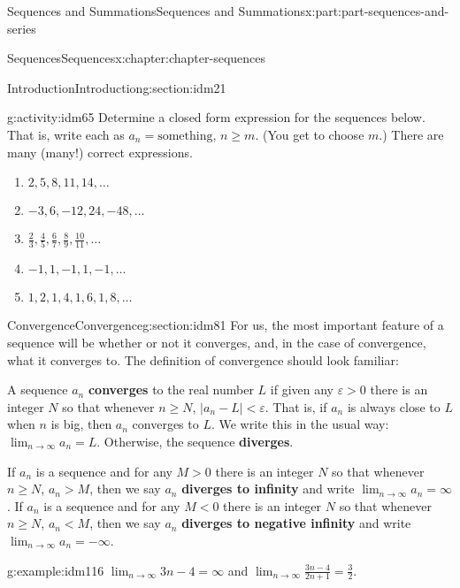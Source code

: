 \documentclass[oneside,10pt,]{book}
\newcommand{\terminology}[1]{\textbf{#1}}
\begin{document}
\begin{partptx}{Sequences and Summations}{}{Sequences and Summations}{}{}{x:part:part-sequences-and-series}
\begin{chapterptx}{Sequences}{}{Sequences}{}{}{x:chapter:chapter-sequences}
\begin{sectionptx}{Introduction}{}{Introduction}{}{}{g:section:idm21}
\begin{activity}{}{g:activity:idm65}%
Determine a closed form expression for the sequences below. That is, write each as \(a_n = \textrm{something}\), \(n \geq m\). (You get to choose \(m\).) There are many (many!) correct expressions.%
\begin{enumerate}[font=\bfseries,label=(\alph*),ref=\alph*]
\item{}\(2, 5, 8, 11, 14, \dots\)\item{}\(-3, 6, -12, 24, -48, \dots\)\item{}\(\frac{2}{3}, \frac{4}{5}, \frac{6}{7}, \frac{8}{9}, \frac{10}{11}, \dots\)\item{}\(-1, 1, -1, 1, -1, \dots\)\item{}\(1, 2, 1, 4, 1, 6, 1, 8, \dots\)\end{enumerate}
\end{activity}
\end{sectionptx}
%
%
\typeout{************************************************}
\typeout{************************************************}
%
\begin{sectionptx}{Convergence}{}{Convergence}{}{}{g:section:idm81}
For us, the most important feature of a sequence will be whether or not it converges, and, in the case of convergence, what it converges to. The definition of convergence should look familiar:%
\par
A sequence \(a_n\) \terminology{converges} to the real number \(L\) if given any \(\varepsilon > 0\) there is an integer \(N\) so that whenever \(n \geq N\), \(|a_n - L| < \varepsilon\). That is, if \(a_n\) is always close to \(L\) when \(n\) is big, then \(a_n\) converges to \(L\). We write this in the usual way: \(\displaystyle\lim_{n \to \infty}a_n = L\). Otherwise, the sequence \terminology{diverges}.%
\par
If \(a_n\) is a sequence and for any \(M > 0\) there is an integer \(N\) so that whenever \(n \geq N\), \(a_n > M\), then we say \(a_n\) \terminology{diverges to infinity} and write \(\displaystyle\lim_{n \to \infty}a_n = \infty\). If \(a_n\) is a sequence and for any \(M < 0\) there is an integer \(N\) so that whenever \(n \geq N\), \(a_n < M\), then we say \(a_n\) \terminology{diverges to negative infinity} and write \(\displaystyle\lim_{n \to \infty}a_n = -\infty\).%
\begin{example}{}{g:example:idm116}%
\(\displaystyle\lim_{n \to \infty} 3n-4 = \infty\) and \(\displaystyle\lim_{n \to \infty} \frac{3n-4}{2n+1} = \frac{3}{2}\).\end{example}

\end{sectionptx}
\end{chapterptx}
\end{partptx}
\end{document}
